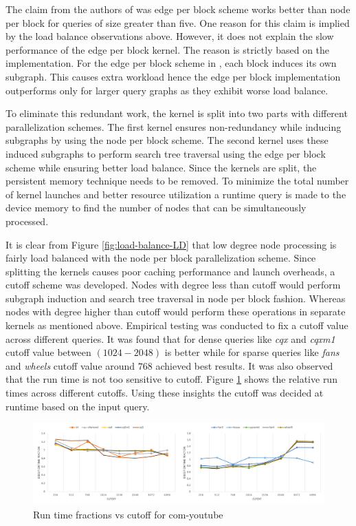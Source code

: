 The claim from the authors of \cite{PARSEC_VD} was edge per block scheme works better than node per block for queries of size greater than five.
One reason for this claim is implied by the load balance observations above. However, it does not explain the slow performance of the edge per block kernel.
The reason is strictly based on the implementation. For the edge per block scheme in \cite{PARSEC_VD}, each block induces its own subgraph.
This causes extra workload hence the edge per block implementation outperforms only for larger query graphs as they exhibit worse load balance.

To eliminate this redundant work, the kernel is split into two parts with different parallelization schemes.
The first kernel ensures non-redundancy while inducing subgraphs by using the node per block scheme.
The second kernel uses these induced subgraphs to perform search tree traversal using the edge per block scheme while ensuring better load balance.
Since the kernels are split, the persistent memory technique needs to be removed.
To minimize the total number of kernel launches and better resource utilization a runtime query is made to the device memory to find the number of nodes that can be simultaneously processed.

It is clear from Figure \ref{fig:load-balance-LD} that low degree node processing is fairly load balanced with the node per block parallelization scheme.
Since splitting the kernels causes poor caching performance and launch overheads, a cutoff scheme was developed.
Nodes with degree less than cutoff would perform subgraph induction and search tree traversal in node per block fashion.
Whereas nodes with degree higher than cutoff would perform these operations in separate kernels as mentioned above.
Empirical testing was conducted to fix a cutoff value across different queries.
It was found that for dense queries like \textit{cqx} and \textit{cqxm1} cutoff value between $(1024 - 2048)$ is better while for sparse queries like \textit{fans} and \textit{wheels} cutoff value around $768$ achieved best results. 
It was also observed that the run time is not too sensitive to cutoff.
Figure \ref{fig:cutoff-tests} shows the relative run times across different cutoffs.
Using these insights the cutoff was decided at runtime based on the input query.

\begin{figure}[h]
    \includegraphics[width=\textwidth]{fig/improvements/cutoff-tests-yt.png}
    \caption{Run time fractions vs cutoff for com-youtube}
    \label{fig:cutoff-tests}
\end{figure}

